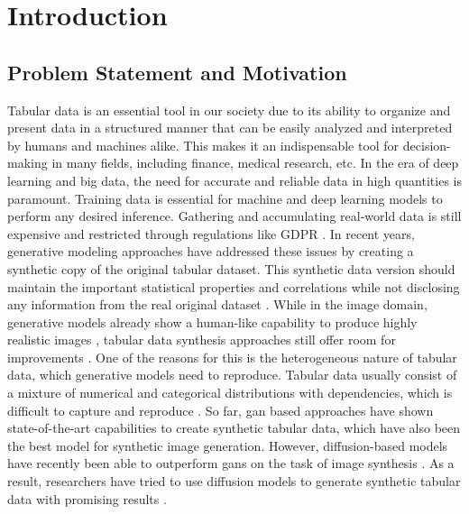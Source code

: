\chapter{Introduction}
\label{ch:introduction}

\section{Problem Statement and Motivation}
\label{ch:intro-problemStatement}

Tabular data is an essential tool in our society due to its ability to organize and present data in a structured manner
that can be easily analyzed and interpreted by humans and machines alike.
This makes it an indispensable tool for decision-making in many fields, including finance, medical research, etc.
In the era of deep learning and big data, the need for accurate and reliable data in high quantities is paramount.
Training data is essential for machine and deep learning models to perform any desired inference.
Gathering and accumulating real-world data is still expensive \cite{borisov2022DeepNeuralNetworks} and restricted through regulations like GDPR \cite{european_commission_regulation_2016}.
In recent years, generative modeling approaches have addressed these issues by creating a synthetic copy of the original tabular dataset.
This synthetic data version should maintain the important statistical properties and correlations while not disclosing any information from the real original dataset \cite{goodfellow2020GenerativeAdversarialNetworks, mottini2018AirlinePassengerName}.
While in the image domain, generative models already show a human-like capability to produce highly realistic images \cite{dhariwal2021DiffusionModelsBeat},
tabular data synthesis approaches still offer room for improvements \cite{chundawat2022UniversalMetricRobust}.
One of the reasons for this is the heterogeneous nature of tabular data, which generative models need to reproduce.
Tabular data usually consist of a mixture of numerical and categorical distributions with dependencies, which is difficult to capture and reproduce \cite{borisov2022DeepNeuralNetworks}.
So far, \gls{gan} based approaches have shown state-of-the-art capabilities to create synthetic tabular data, which have also been the best model for synthetic image generation.
However, diffusion-based models have recently been able to outperform \glspl{gan} on the task of image synthesis \cite{dhariwal2021DiffusiIonModelsBeat}.
As a result, researchers have tried to use diffusion models to generate synthetic tabular data with promising results \cite{kotelnikov2022TabDDPMModellingTabular, zheng2022DiffusionModelsMissing}.

